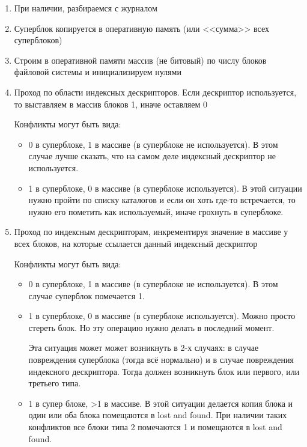 \begin{enumerate}
\item При наличии, разбираемся с журналом
\item Суперблок копируется в оперативную память (или <<сумма>> всех суперблоков)
\item Строим в оперативной памяти массив (не битовый) по числу блоков файловой системы и инициализируем нулями
\item Проход по области индексных дескрипторов. Если дескриптор используется, то выставляем в массив блоков 1, иначе оставляем 0

Конфликты могут быть вида:
\begin{itemize}
\item 0 в суперблоке, 1 в массиве (в суперблоке не используется). В этом случае лучше сказать, что на самом деле индексный дескриптор не используется.
\item 1 в суперблоке, 0 в массиве (в суперблоке используется). В этой ситуации нужно пройти по списку каталогов и если он хоть где-то встречается, то нужно его пометить как используемый, иначе грохнуть в суперблоке.
\end{itemize}
\item Проход по индексным дескрипторам, инкрементируя значение в массиве у всех блоков, на которые ссылается данный индексный дескриптор

Конфликты могут быть вида:
\begin{itemize}
\item 0 в суперблоке, 1 в массиве (в суперблоке не используется). В этом случае суперблок помечается 1.
\item 1 в суперблоке, 0 в массиве (в суперблоке используется). Можно просто стереть блок. Но эту операцию нужно делать в последний момент. 

Эта ситуация может может возникнуть в 2-х случаях: в случае повреждения суперблока (тогда всё нормально) и в случае повреждения индексного дескриптора. Тогда должен возникнуть блок или первого, или третьего типа.
\item 1 в супер блоке, >1 в массиве. В этой ситуации делается копия блока и один или оба блока помещаются в lost and found. При наличии таких конфликтов все блоки типа 2 помечаются 1 и помещаются в lost and found.
\end{itemize}
\end{enumerate}






